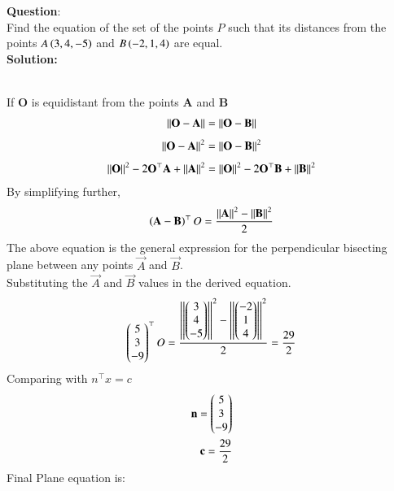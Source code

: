 \documentclass[journal]{IEEEtran}
\begin{document}
	
	\textbf{Question}:\\
	Find the equation of the set of the points $P$ such that its distances from the points
	$A\left(3, 4, -5\right)$ and $B\left(-2, 1, 4\right)$ are equal.
	\\ \textbf{Solution: }\\
	\begin{table}[h!]    
		\centering
		
		\caption{}
	\end{table}\\
	If \textbf{O} is equidistant from the points \textbf{A} and \textbf{B}
	\begin{align}
		\left\vert\left\vert\mathbf{O}-\mathbf{A}\right\vert\right\vert = \left\vert\left\vert\mathbf{O}-\mathbf{B}\right\vert\right\vert\\ \label{eq1.1.8.28.1}
	\end{align}
	\begin{align}
		\left\vert\left\vert\mathbf{O}-\mathbf{A}\right\vert\right\vert^2 = \left\vert\left\vert\mathbf{O}-\mathbf{B}\right\vert\right\vert^2\label{eq1.1.8.28.2}\\
	\end{align}
	\begin{align}
		\left\vert\left\vert\mathbf{O}\right\vert\right\vert^2 - 2\mathbf{O}^\top \mathbf{A} + \left\vert\left\vert\mathbf{A}\right\vert\right\vert^2 = \left\vert\left\vert\mathbf{O}\right\vert\right\vert^2 - 2\mathbf{O}^\top\mathbf{B} + \left\vert\left\vert\mathbf{B}\right\vert\right\vert^2\label{eq1.1.8.28.3}
	\end{align}
	By simplifying further,
	\begin{align}
		\left(\mathbf{A}-\mathbf{B}\right)^\top O = \frac{\left\vert\left\vert\mathbf{A}\right\vert\right\vert^2-\left\vert\left\vert\mathbf{B}\right\vert\right\vert^2}{2} \label{eq1.1.8.28.4}
	\end{align}
	The above equation is the general expression for the perpendicular bisecting plane between any points $\vec{A}$ and $\vec{B}$.\\
	Substituting the $\vec{A}$ and $\vec{B}$ values in the derived equation.\\
	\begin{align}
		\begin{pmatrix}5 \\ 3 \\ -9\end{pmatrix}^\top O = \frac{\left\vert\left\vert\begin{pmatrix}3 \\ 4\\-5\end{pmatrix}\right\vert\right\vert^2-\left\vert\left\vert\begin{pmatrix}-2\\ 1\\4\end{pmatrix}\right\vert\right\vert^2}{2} = \frac{29}{2}\label{eq1.1.8.28.5}
	\end{align}
	Comparing with $n^\top x = c$
	\begin{align}
		\mathbf{n} = \begin{pmatrix}5 \\ 3 \\ -9\end{pmatrix}\\ \label{eq1.1.8.28.6}
		\mathbf{c} = \frac{29}{2}\\    
	\end{align}
	Final Plane equation is:
	
\end{document}
